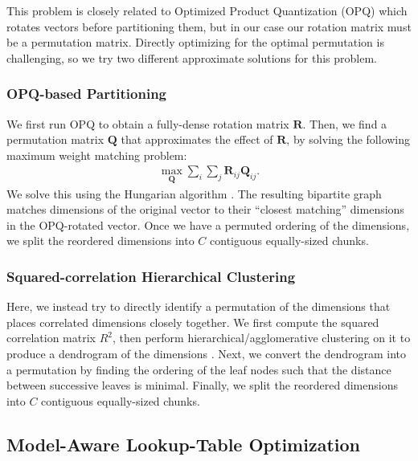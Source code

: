 \documentclass{article}
\begin{document}
This problem is closely related to Optimized Product Quantization (OPQ) \citep{ge2013optimized} which rotates vectors before partitioning them, but in our case our rotation matrix must be a permutation matrix.
Directly optimizing for the optimal permutation is challenging, so we try two different approximate solutions for this problem. 

\subsubsection{OPQ-based Partitioning}

We first run OPQ to obtain a fully-dense rotation matrix $\bm{R}$. 
Then, we find a permutation matrix $\bm{Q}$ that approximates the effect of $\bm{R}$, by solving the following maximum weight matching problem:
\begin{gather}
    \max_{\bm{Q}} \sum_i \sum_j \bm{R}_{ij} \bm{Q}_{ij}.
\end{gather}
We solve this using the Hungarian algorithm \citep{kuhn1955hungarian}.
The resulting bipartite graph matches dimensions of the original vector to their ``closest matching'' dimensions in the OPQ-rotated vector.
Once we have a permuted ordering of the dimensions, we split the reordered dimensions into $C$ contiguous equally-sized chunks.

\subsubsection{Squared-correlation Hierarchical Clustering}

Here, we instead try to directly identify a permutation of the dimensions that places correlated dimensions closely together.
We first compute the squared correlation matrix $R^2$, then perform hierarchical/agglomerative clustering on it to produce a dendrogram of the dimensions \cite{mullner2013fastcluster}.
Next, we convert the dendrogram into a permutation by finding the ordering of the leaf nodes such that the distance between successive leaves is minimal.
Finally, we split the reordered dimensions into $C$ contiguous equally-sized chunks.

\subsection{Model-Aware Lookup-Table Optimization}
\label{sec:lut}
\end{document}
